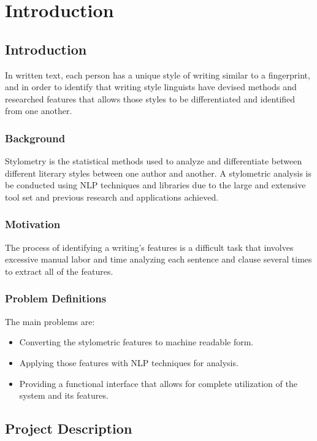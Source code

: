 \chapter{Introduction}

\section{Introduction}
In written text, each person has a unique style of writing similar to a fingerprint, and in order to identify that writing style linguists have devised methods and researched features that allows those styles to be differentiated and identified from one another.

\subsection{Background}
Stylometry is the statistical methods used to analyze and differentiate between different literary styles between one author and another. A stylometric analysis is be conducted using NLP techniques and libraries due to the large and extensive tool set and previous research and applications achieved.

\subsection{Motivation}
The process of identifying a writing's features is a difficult task that involves excessive manual labor and time analyzing each sentence and clause several times to extract all of the features.

\subsection{Problem Definitions}
The main problems are:
\begin{itemize}
  \item Converting the stylometric features to machine readable form.
  \item Applying those features with NLP techniques for analysis.
  \item Providing a functional interface that allows for complete utilization of the system and its features.
\end{itemize}

\section{Project Description}

